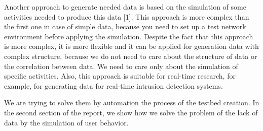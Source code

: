 

Another approach to generate needed data is based on the simulation of some activities needed to produce this data [1]. This approach is more complex than the first one in case of simple data, because you need to set up a test network environment before applying the simulation. Despite the fact that this approach is more complex, it is more flexible and it can be applied for generation data with complex structure, because we do not need to care about the structure of data or the correlation between data. We need to care only about the simulation of specific activities. Also, this approach is suitable for real-time research, for example, for generating data for real-time intrusion detection systems. 

 

We are trying to solve them by automation the process of the testbed creation. In the second section of the report, we show how we solve the problem of the lack of data by the simulation of user behavior.



